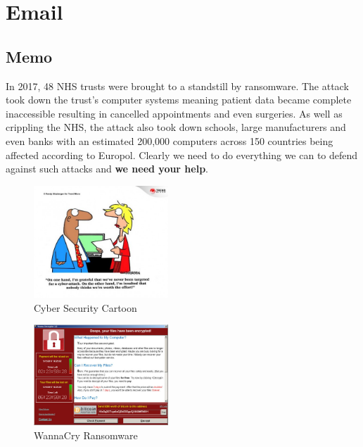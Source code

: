 \documentclass{article}
\begin{document}


\section{Email}
\subsection{Memo}%

In 2017, 48 NHS trusts were brought to a standstill by ransomware. The attack took down the trust's computer systems meaning patient data became complete inaccessible resulting in cancelled appointments and even surgeries\cite{wannacry_bbc}. As well as crippling the NHS, the attack also took down schools, large manufacturers and even banks with an estimated 200,000 computers across 150 countries being affected according to Europol\cite{wannacry_reuters}. Clearly we need to do everything we can to defend against such attacks and \textbf{we need your help}.

\begin{figure}
\includegraphics[width=0.45\textwidth]{Figures/Cartoon}
\caption{Cyber Security Cartoon\cite{cartoon}}
\label{Cartoon}
\end{figure}

\begin{figure}
\includegraphics[width=0.45\textwidth]{Figures/wannacry}
\caption{WannaCry Ransomware}
\label{wannacry_decryptor}
\end{figure}
\end{document}
